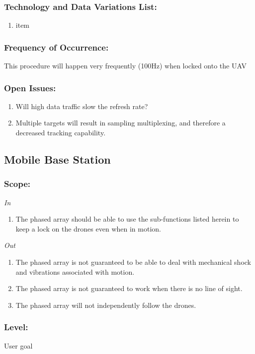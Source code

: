 \documentclass[ProductRequirements.tex]{subfiles}
\begin{document}
	\subsubsection*{Technology and Data Variations List:}
	\begin{enumerate}\itemsep1pt
		\item item
	\end{enumerate}
	\subsubsection*{Frequency of Occurrence:}
	This procedure will happen very frequently (100Hz) when locked onto the UAV
	\subsubsection*{Open Issues:}
	\begin{enumerate}\itemsep1pt
		\item Will high data traffic slow the refresh rate?
		\item Multiple targets will result in sampling multiplexing, and therefore a decreased tracking capability. 
	\end{enumerate}		
	
	\subsection{Mobile Base Station}
	\subsubsection*{Scope:}
	\textit{In}
		\begin{enumerate}
			\item The phased array should be able to use the sub-functions listed herein to keep a lock on the drones even when in motion.
		\end{enumerate}
	\textit{Out}
		\begin{enumerate}
			\item The phased array is not guaranteed to be able to deal with mechanical shock and vibrations associated with motion.
			\item The phased array is not guaranteed to work when there is no line of sight.
			\item The phased array will not independently follow the drones.
		\end{enumerate}
	\subsubsection*{Level:}
	User goal
\end{document}
